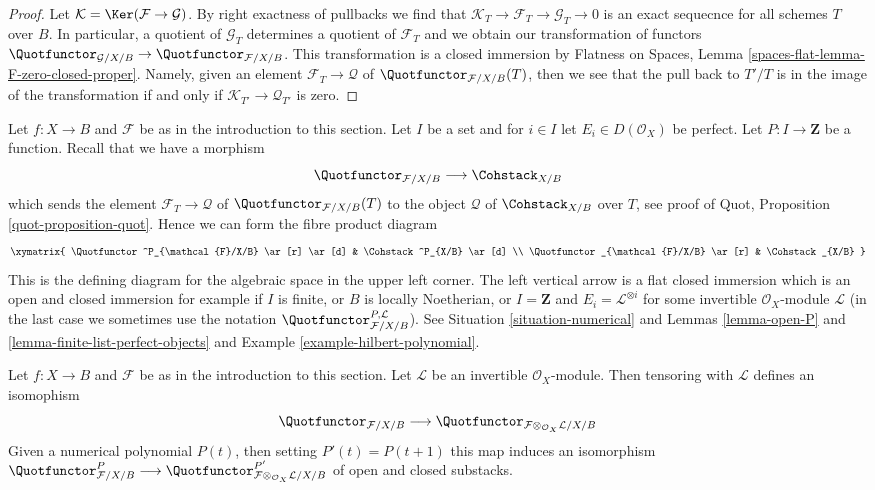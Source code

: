 \begin{proof}
Let $\mathcal{K} = \Ker(\mathcal{F} \to \mathcal{G})$. By right
exactness of pullbacks we find that
$\mathcal{K}_T \to \mathcal{F}_T \to \mathcal{G}_T \to 0$
is an exact sequecnce for all schemes $T$ over $B$.
In particular, a quotient of $\mathcal{G}_T$
determines a quotient of $\mathcal{F}_T$ and we obtain our transformation
of functors
$\Quotfunctor_{\mathcal{G}/X/B} \to \Quotfunctor_{\mathcal{F}/X/B}$.
This transformation is a closed immersion by
Flatness on Spaces, Lemma \ref{spaces-flat-lemma-F-zero-closed-proper}.
Namely, given an element $\mathcal{F}_T \to \mathcal{Q}$ of
$\Quotfunctor_{\mathcal{F}/X/B}(T)$, then we see that the pull
back to $T'/T$ is in the image of the transformation if and
only if $\mathcal{K}_{T'} \to \mathcal{Q}_{T'}$ is zero.
\end{proof}

\begin{remark}
\label{remark-quot-numerical}
Let $f : X \to B$ and $\mathcal{F}$ be as in the introduction to this section.
Let $I$ be a set and for $i \in I$ let $E_i \in D(\mathcal{O}_X)$ be perfect.
Let $P : I \to \mathbf{Z}$ be a function. Recall that we have a morphism
$$
\Quotfunctor_{\mathcal{F}/X/B} \longrightarrow \Cohstack_{X/B}
$$
which sends the element $\mathcal{F}_T \to \mathcal{Q}$
of $\Quotfunctor_{\mathcal{F}/X/B}(T)$ to the object $\mathcal{Q}$
of $\Cohstack_{X/B}$ over $T$, see proof of
Quot, Proposition \ref{quot-proposition-quot}. Hence we can form
the fibre product diagram
$$
\xymatrix{
\Quotfunctor^P_{\mathcal{F}/X/B} \ar[r] \ar[d] &
\Cohstack^P_{X/B} \ar[d] \\
\Quotfunctor_{\mathcal{F}/X/B} \ar[r] &
\Cohstack_{X/B}
}
$$
This is the defining diagram for the algebraic space in the
upper left corner. The left vertical arrow is a
flat closed immersion which is an open and closed immersion
for example if $I$ is finite, or $B$ is locally Noetherian, or
$I = \mathbf{Z}$ and $E_i = \mathcal{L}^{\otimes i}$ for some
invertible $\mathcal{O}_X$-module $\mathcal{L}$ (in the last
case we sometimes use the notation
$\Quotfunctor^{P, \mathcal{L}}_{\mathcal{F}/X/B}$).
See Situation \ref{situation-numerical} and
Lemmas \ref{lemma-open-P} and \ref{lemma-finite-list-perfect-objects} and
Example \ref{example-hilbert-polynomial}.
\end{remark}

\begin{lemma}
\label{lemma-quot-tensor-invertible}
Let $f : X \to B$ and $\mathcal{F}$ be as in the introduction to this section.
Let $\mathcal{L}$ be an invertible $\mathcal{O}_X$-module.
Then tensoring with $\mathcal{L}$ defines an isomophism
$$
\Quotfunctor_{\mathcal{F}/X/B}
\longrightarrow
\Quotfunctor_{\mathcal{F} \otimes_{\mathcal{O}_X} \mathcal{L}/X/B}
$$
Given a numerical polynomial $P(t)$, then setting $P'(t) = P(t + 1)$
this map induces an isomorphism
$\Quotfunctor^P_{\mathcal{F}/X/B}
\longrightarrow
\Quotfunctor^{P'}_{\mathcal{F} \otimes_{\mathcal{O}_X} \mathcal{L}/X/B}$
of open and closed substacks.
\end{lemma}

